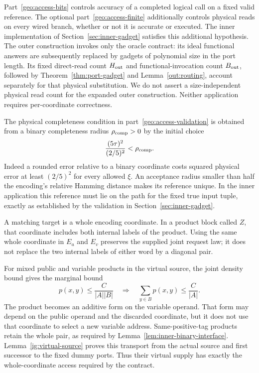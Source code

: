 Part~\ref{geo:access-bits} controls accuracy of a completed logical call
on a fixed valid reference. The optional
part~\ref{geo:access-finite} additionally controls physical reads on
every wired branch, whether or not it is accurate or executed. The
inner implementation of Section~\ref{sec:inner-gadget} satisfies this
additional hypothesis. The outer construction invokes only the oracle
contract: its ideal functional answers are subsequently replaced by
gadgets of polynomial size in the port length. Its fixed direct-read
count $H_{\rm out}$ and functional-invocation count $B_{\rm out}$,
followed by Theorem~\ref{thm:port-gadget} and
Lemma~\ref{out:routing}, account separately for that physical
substitution. We do not assert a size-independent physical read count
for the expanded outer construction. Neither application requires
per-coordinate correctness.

The physical completeness condition in part~\ref{geo:access-validation}
is obtained from a binary completeness radius $\rho_{\rm comp}>0$ by
the initial choice
\begin{equation}\label{geo:rounding-radius}
 \frac{(5\tau)^2}{(2/5)^2}<\rho_{\rm comp}.
\end{equation}
Indeed a rounded error relative to a binary coordinate costs squared
physical error at least $(2/5)^2$ for every allowed $\xi$. An
acceptance radius smaller than half the encoding's relative Hamming
distance makes its reference unique. In the inner application this
reference must lie on the path for the fixed true input tuple, exactly
as established by the validation in Section~\ref{sec:inner-gadget}.

\begin{remark}
A matching target is a whole encoding coordinate. In a product block
called $Z$, that coordinate includes both internal labels of the product.
Using the same whole coordinate in $E_u$ and $E_v$ preserves the supplied
joint request law; it does not replace the two internal labels of either
word by a diagonal pair.

For mixed public and variable products in the virtual source, the joint
density bound gives the marginal bound
\[
 p(x,y)\le\frac{C}{|A||B|}
 \quad\Longrightarrow\quad
 \sum_{y\in B}p(x,y)\le\frac C{|A|}.
\]
The product becomes an additive form on the variable operand. That form
may depend on the public operand and the discarded coordinate, but it
does not use that coordinate to select a new variable address.
Same-positive-tag products retain the whole pair, as required by
Lemma~\ref{lem:inner-binary-interface}. Lemma~\ref{ig:virtual-source}
proves this transport from the actual source and first successor to the
fixed dummy ports. Thus their virtual supply has exactly the
whole-coordinate access required by the contract.
\end{remark}

